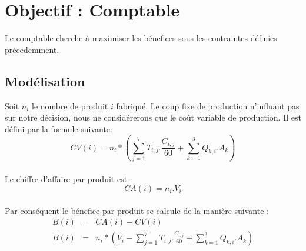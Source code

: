 \section{Objectif : Comptable}
Le comptable cherche à maximiser les bénefices sous les contraintes définies
précedemment.

\subsection{Modélisation}
Soit $n_i$ le nombre de produit $i$ fabriqué. Le coup fixe de production
n'influant pas sur notre décision, nous ne considérerons que le coût variable de
production. Il est défini par la formule suivante:
\begin{displaymath}
CV(i) = n_i * \left (\sum_{j = 1}^{7} T_{i,j} .
\frac{C_{i,j}}{60} + \sum_{k = 1}^{3} Q_{k,i} . A_{k} \right )
\end{displaymath}
~\\
Le chiffre d'affaire par produit est :
\begin{displaymath}
CA(i) = n_i . V_i
\end{displaymath}
~\\
Par conséquent le bénefice par produit se calcule de la manière suivante :
\begin{eqnarray*}
	B(i) &=& CA(i) - CV(i)\\
	B(i) &=& n_i * \left (V_i - \sum_{j = 1}^{7} T_{i,j} . \frac{C_{i,j}}{60} +
	\sum_{k = 1}^{3} Q_{k,i} . A_{k} \right )
\end{eqnarray*}